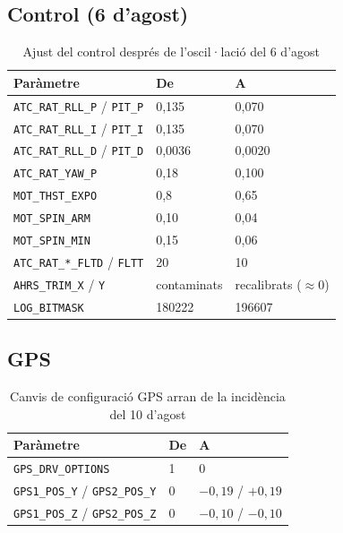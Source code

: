 \subsection{Control (6 d'agost)}

\begin{table}[H]
    \centering
    \caption{Ajust del control després de l'oscil·lació del 6 d'agost}
    \label{tab:canvis-control}
    \begin{tabular}{lll}
        \toprule
        Paràmetre & De & A \\
        \midrule
        \texttt{ATC\_RAT\_RLL\_P} / \texttt{PIT\_P} & 0,135 & 0,070 \\
        \texttt{ATC\_RAT\_RLL\_I} / \texttt{PIT\_I} & 0,135 & 0,070 \\
        \texttt{ATC\_RAT\_RLL\_D} / \texttt{PIT\_D} & 0,0036 & 0,0020 \\
        \texttt{ATC\_RAT\_YAW\_P} & 0,18 & 0,100 \\
        \texttt{MOT\_THST\_EXPO} & 0,8 & 0,65 \\
        \texttt{MOT\_SPIN\_ARM} & 0,10 & 0,04 \\
        \texttt{MOT\_SPIN\_MIN} & 0,15 & 0,06 \\
        \texttt{ATC\_RAT\_*\_FLTD} / \texttt{FLTT} & 20 & 10 \\
        \texttt{AHRS\_TRIM\_X} / \texttt{Y} & contaminats & recalibrats ($\approx 0$) \\
        \texttt{LOG\_BITMASK} & 180222 & 196607 \\
        \bottomrule
    \end{tabular}
\end{table}

\subsection{GPS}

\begin{table}[H]
    \centering
    \caption{Canvis de configuració GPS arran de la incidència del 10 d'agost}
    \label{tab:canvis-gps}
    \begin{tabular}{lll}
        \toprule
        Paràmetre & De & A \\
        \midrule
        \texttt{GPS\_DRV\_OPTIONS} & 1 & 0 \\
        \texttt{GPS1\_POS\_Y} / \texttt{GPS2\_POS\_Y} & 0 & $-0{,}19$ / $+0{,}19$ \\
        \texttt{GPS1\_POS\_Z} / \texttt{GPS2\_POS\_Z} & 0 & $-0{,}10$ / $-0{,}10$ \\
        \bottomrule
    \end{tabular}
\end{table}

